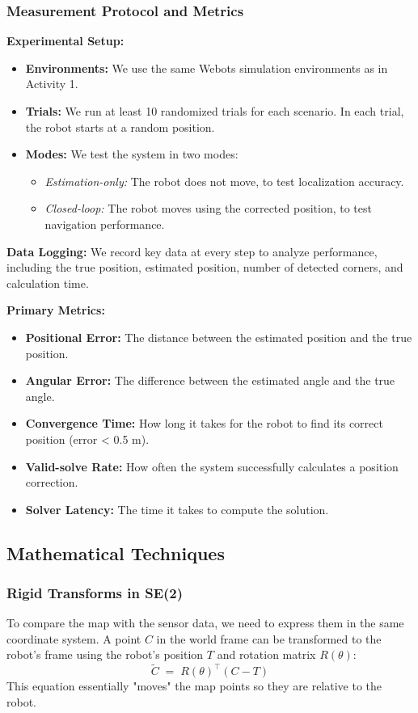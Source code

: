 \documentclass[conference]{IEEEtran}
\begin{document}
\subsubsection{Measurement Protocol and Metrics}
\textbf{Experimental Setup:}
\begin{itemize}
  \item \textbf{Environments:} We use the same Webots simulation environments as in Activity 1.
  \item \textbf{Trials:} We run at least 10 randomized trials for each scenario. In each trial, the robot starts at a random position.
  \item \textbf{Modes:} We test the system in two modes:
    \begin{itemize}
        \item \textit{Estimation-only:} The robot does not move, to test localization accuracy.
        \item \textit{Closed-loop:} The robot moves using the corrected position, to test navigation performance.
    \end{itemize}
\end{itemize}

\textbf{Data Logging:}
We record key data at every step to analyze performance, including the true position, estimated position, number of detected corners, and calculation time.

\textbf{Primary Metrics:}
\begin{itemize}
  \item \textbf{Positional Error:} The distance between the estimated position and the true position.
  \item \textbf{Angular Error:} The difference between the estimated angle and the true angle.
  \item \textbf{Convergence Time:} How long it takes for the robot to find its correct position (error < 0.5 m).
  \item \textbf{Valid-solve Rate:} How often the system successfully calculates a position correction.
  \item \textbf{Solver Latency:} The time it takes to compute the solution.
\end{itemize}



\subsection{Mathematical Techniques}

\subsubsection{Rigid Transforms in SE(2)}
To compare the map with the sensor data, we need to express them in the same coordinate system. A point $C$ in the world frame can be transformed to the robot's frame using the robot's position $T$ and rotation matrix $R(\theta)$:
\[
\tilde C \;=\; R(\theta)^\top (C - T)
\]
This equation essentially "moves" the map points so they are relative to the robot.
\end{document}
